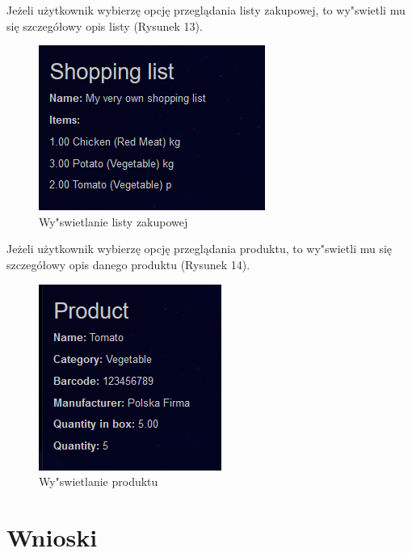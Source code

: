 \documentclass{article}
\begin{document}
Jeżeli użytkownik wybierzę opcję przeglądania listy zakupowej, to wy"swietli mu się szczegółowy opis listy (Rysunek 13).
\begin{figure}[!ht]
  \centering
    \includegraphics[]{reshp12}\par\vspace{1cm}
  \caption{Wy"swietlanie listy zakupowej}
\end{figure}
\newpage
Jeżeli użytkownik wybierzę opcję przeglądania produktu, to wy"swietli mu się szczegółowy opis danego produktu (Rysunek 14).
\begin{figure}[!ht]
  \centering
    \includegraphics[]{reshp13}\par\vspace{1cm}
  \caption{Wy"swietlanie produktu}
\end{figure}

\section{Wnioski}
\end{document}
